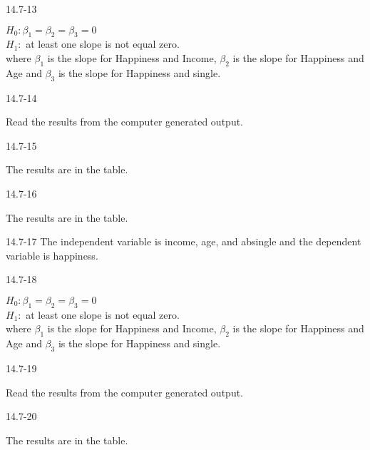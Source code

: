 \begin{exsol@solution}{14.7-13}

       $H_0: \beta_1 = \beta_2 = \beta_3 = 0$ \\
       $H_1:$ at least one slope is not equal zero. \\
       where $\beta_1$ is the slope for Happiness and Income,  $\beta_2$ is the slope for Happiness and Age and $\beta_3$ is         the slope for Happiness and single.

\end{exsol@solution}
\begin{exsol@solution}{14.7-14}

       Read the results from the computer generated output.

\end{exsol@solution}
\begin{exsol@solution}{14.7-15}

      The results are in the table.

\end{exsol@solution}
\begin{exsol@solution}{14.7-16}

  The results are in the table.

\end{exsol@solution}
\begin{exsol@solution}{14.7-17}
       The independent variable is income,   age, and absingle and the dependent variable is happiness.
\end{exsol@solution}
\begin{exsol@solution}{14.7-18}

       $H_0: \beta_1 = \beta_2 = \beta_3 = 0$ \\
       $H_1:$ at least one slope is not equal zero. \\
       where $\beta_1$ is the slope for Happiness and Income,  $\beta_2$ is the slope for Happiness and Age and $\beta_3$ is         the slope for Happiness and single.

\end{exsol@solution}
\begin{exsol@solution}{14.7-19}

       Read the results from the computer generated output.

\end{exsol@solution}
\begin{exsol@solution}{14.7-20}

      The results are in the table.

\end{exsol@solution}
